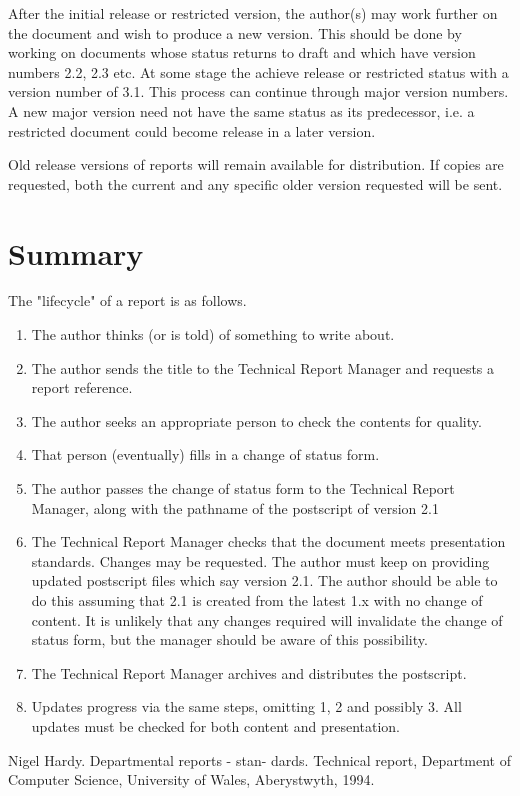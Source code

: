 \documentclass[a4paper, 12pt]{article}
\begin{document}
\begin{multicols}{2}
After the initial release or restricted version, the author(s) may work further on the document and wish to
produce a new version. This should be done by working
on documents whose status returns to draft and which
have version numbers 2.2, 2.3 etc. At some stage the
achieve release or restricted status with a version number of 3.1. This process can continue through major
version numbers. A new major version need not have
the same status as its predecessor, i.e. a restricted document could become release in a later version.

Old release versions of reports will remain available
for distribution. If copies are requested, both the current and any specific older version requested will be
sent.
\section{Summary}
The "lifecycle" of a report is as follows.
\begin{enumerate}
\item The author thinks (or is told) of something to write
about.
\item The author sends the title to the Technical Report
Manager and requests a report reference.
\item The author seeks an appropriate person to check the
contents for quality.
\item That person (eventually) fills in a change of status
form.
\item The author passes the change of status form to the
Technical Report Manager, along with the pathname of the postscript of version 2.1
\item The Technical Report Manager checks that the document meets presentation standards. Changes may
be requested. The author must keep on providing
updated postscript files which say version 2.1. The
author should be able to do this assuming that 2.1
is created from the latest 1.x with no change of content. It is unlikely that any changes required will
invalidate the change of status form, but the manager should be aware of this possibility.
\item The Technical Report Manager archives and distributes the postscript.
\item Updates progress via the same steps, omitting 1, 2
and possibly 3. All updates must be checked for
both content and presentation.
\end{enumerate}
\begin{thebibliography}{9}
Nigel Hardy. Departmental reports - stan-
dards.   Technical report, Department of
Computer  Science,  University  of  Wales,
Aberystwyth, 1994.
\end{thebibliography}
\end{multicols}
\end{document}
